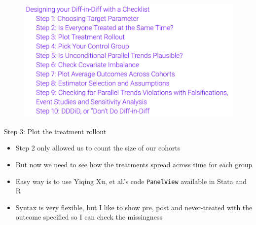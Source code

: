 \documentclass{beamer}
\begin{document}
\begin{frame}
 
\begin{figure}
    \centering
    \includegraphics[width=\textwidth]{./lecture_includes/checklist}
\end{figure}

\end{frame}

\begin{frame}{Step 3: Plot the treatment rollout}

\begin{itemize}

\item Step 2 only allowed us to count the size of our cohorts
\item But now we need to see how the treatments spread across time for each group
\item Easy way is to use Yiqing Xu, et al.'s code \texttt{PanelView} available in Stata and R
\item Syntax is very flexible, but I like to show pre, post and never-treated with the outcome specified so I can check the missingness
\end{itemize}

\end{frame}
\end{document}
